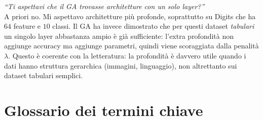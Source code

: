 \documentclass[11pt,a4paper]{article}
\begin{document}
\begin{domanda}
\textit{``Ti aspettavi che il GA trovasse architetture con un solo layer?''}\\
A priori no. Mi aspettavo architetture più profonde, soprattutto su Digits
che ha $64$ feature e $10$ classi. Il GA ha invece dimostrato che per
questi dataset \emph{tabulari} un singolo layer abbastanza ampio è già
sufficiente: l'extra profondità non aggiunge accuracy ma aggiunge
parametri, quindi viene scoraggiata dalla penalità $\lambda$. Questo è
coerente con la letteratura: la profondità è davvero utile quando i dati
hanno struttura gerarchica (immagini, linguaggio), non altrettanto sui
dataset tabulari semplici.
\end{domanda}

\newpage

\appendix
\section{Glossario dei termini chiave}
\end{document}
